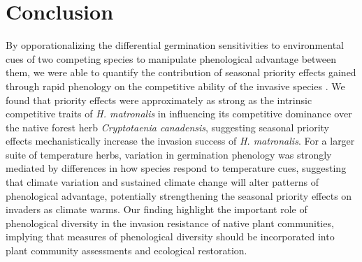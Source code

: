 \documentclass{article}\usepackage[]{graphicx}\usepackage[]{color}
\begin{document}
\section*{Conclusion}
By opporationalizing the differential germination sensitivities to environmental cues of two competing species to manipulate phenological advantage between them, we were able to quantify the contribution of seasonal priority effects gained through rapid phenology on the competitive ability of the invasive species . We found that priority effects were approximately as strong as the intrinsic competitive traits of \textit{H. matronalis} in influencing its competitive dominance over the native forest herb \textit{Cryptotaenia canadensis}, suggesting seasonal priority effects mechanistically increase the invasion success of \textit{H. matronalis}. For a larger suite of temperature herbs, variation in germination phenology was strongly mediated by differences in how species respond to temperature cues, suggesting that climate variation and sustained climate change will alter patterns of phenological advantage, potentially strengthening the seasonal priority effects on invaders as climate warms. Our finding highlight the important role of phenological diversity in the invasion resistance of native plant communities, implying that measures of phenological diversity should be incorporated into plant community assessments and ecological restoration. 




\end{document}
